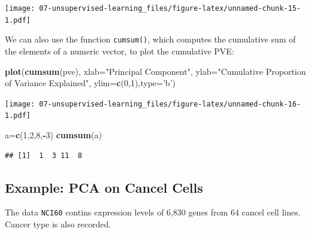 \documentclass[
  openany]{book}
\newenvironment{Shaded}{\begin{snugshade}}{\end{snugshade}}
\newcommand{\DataTypeTok}[1]{\textcolor[rgb]{0.13,0.29,0.53}{#1}}
\newcommand{\DecValTok}[1]{\textcolor[rgb]{0.00,0.00,0.81}{#1}}
\newcommand{\KeywordTok}[1]{\textcolor[rgb]{0.13,0.29,0.53}{\textbf{#1}}}
\newcommand{\NormalTok}[1]{#1}
\newcommand{\OperatorTok}[1]{\textcolor[rgb]{0.81,0.36,0.00}{\textbf{#1}}}
\newcommand{\StringTok}[1]{\textcolor[rgb]{0.31,0.60,0.02}{#1}}
\begin{document}
\texttt{[image: 07-unsupervised-learning\_files/figure-latex/unnamed-chunk-15-1.pdf]}

We can also use the function \texttt{cumsum()}, which computes the cumulative sum of the elements of a numeric vector, to plot the cumulative PVE:

\begin{Shaded}
\begin{Highlighting}[]
\KeywordTok{plot}\NormalTok{(}\KeywordTok{cumsum}\NormalTok{(pve), }\DataTypeTok{xlab=}\StringTok{"Principal Component"}\NormalTok{, }\DataTypeTok{ylab=}\StringTok{"Cumulative Proportion of Variance Explained"}\NormalTok{, }\DataTypeTok{ylim=}\KeywordTok{c}\NormalTok{(}\DecValTok{0}\NormalTok{,}\DecValTok{1}\NormalTok{),}\DataTypeTok{type=}\StringTok{'b'}\NormalTok{)}
\end{Highlighting}
\end{Shaded}

\texttt{[image: 07-unsupervised-learning\_files/figure-latex/unnamed-chunk-16-1.pdf]}

\begin{Shaded}
\begin{Highlighting}[]
\NormalTok{a=}\KeywordTok{c}\NormalTok{(}\DecValTok{1}\NormalTok{,}\DecValTok{2}\NormalTok{,}\DecValTok{8}\NormalTok{,}\OperatorTok{-}\DecValTok{3}\NormalTok{)}
\KeywordTok{cumsum}\NormalTok{(a)}
\end{Highlighting}
\end{Shaded}

\begin{verbatim}
## [1]  1  3 11  8
\end{verbatim}

\hypertarget{example-pca-on-cancel-cells}{%
\subsection{Example: PCA on Cancel Cells}\label{example-pca-on-cancel-cells}}

The data \texttt{NCI60} contins expression levels of 6,830 genes from 64 cancel cell lines. Cancer type is also recorded.

\begin{Shaded}
\end{Shaded}
\end{document}
